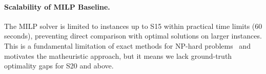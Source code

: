 \paragraph{Scalability of MILP Baseline.}
The MILP solver is limited to instances up to S15 within practical time limits (60 seconds), preventing direct comparison with optimal solutions on larger instances.
This is a fundamental limitation of exact methods for NP-hard problems~\citep{garey1979} and motivates the matheuristic approach, but it means we lack ground-truth optimality gaps for S20 and above.
